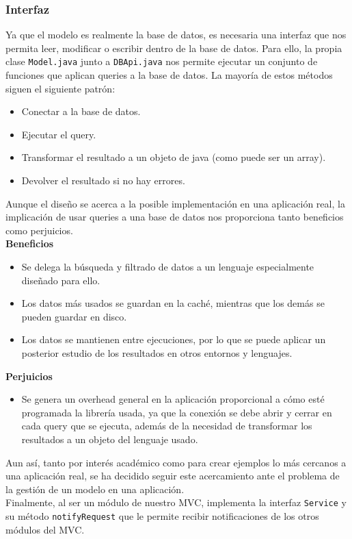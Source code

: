 \subsubsection{Interfaz}
Ya que el modelo es realmente la base de datos, es necesaria una interfaz que nos permita leer, modificar o escribir dentro de la base de datos. Para ello, la propia clase \texttt{Model.java} junto a \texttt{DBApi.java} nos permite ejecutar un conjunto de funciones que aplican queries a la base de datos. La mayoría de estos métodos siguen el siguiente patrón:\\

\begin{itemize}
    \item Conectar a la base de datos.
    \item Ejecutar el query.
    \item Transformar el resultado a un objeto de java (como puede ser un array).
    \item Devolver el resultado si no hay errores.
\end{itemize}\bigskip

Aunque el diseño se acerca a la posible implementación en una aplicación real, la implicación de usar queries a una base de datos nos proporciona tanto beneficios como perjuicios.\\

\textbf{Beneficios}\begin{itemize}
    \item Se delega la búsqueda y filtrado de datos a un lenguaje especialmente diseñado para ello.
    \item Los datos más usados se guardan en la caché, mientras que los demás se pueden guardar en disco.
    \item Los datos se mantienen entre ejecuciones, por lo que se puede aplicar un posterior estudio de los resultados en otros entornos y lenguajes.
\end{itemize}\bigskip

\textbf{Perjuicios}\begin{itemize}
    \item Se genera un overhead general en la aplicación proporcional a cómo esté programada la librería usada, ya que la conexión se debe abrir y cerrar en cada query que se ejecuta, además de la necesidad de transformar los resultados a un objeto del lenguaje usado.
\end{itemize}\bigskip

Aun así, tanto por interés académico como para crear ejemplos lo más cercanos a una aplicación real, se ha decidido seguir este acercamiento ante el problema de la gestión de un modelo en una aplicación.\\

Finalmente, al ser un módulo de nuestro MVC, implementa la interfaz \texttt{Service} y su método \texttt{notifyRequest} que le permite recibir notificaciones de los otros módulos del MVC.